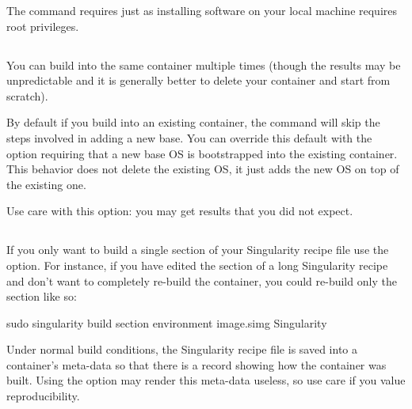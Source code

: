 \documentclass[letterpaper,10pt,english]{sphinxmanual}
\begin{document}
The command requires  just as installing software on your local machine
requires root privileges.


\subsection{}
\label{\detokenize{build_a_container:force}}
You can build into the same container multiple times (though the
results may be unpredictable and it is generally better to delete your
container and start from scratch).

By default if you build into an existing container, the  command will
skip the steps involved in adding a new base. You can override this
default with the  option requiring that a new base OS is bootstrapped
into the existing container. This behavior does not delete the
existing OS, it just adds the new OS on top of the existing one.

Use care with this option: you may get results that you did not
expect.


\subsection{}
\label{\detokenize{build_a_container:section}}
If you only want to build a single section of your Singularity recipe
file use the  option. For instance, if you have edited the  section of a
long Singularity recipe and don’t want to completely re-build the
container, you could re-build only the  section like so:

%
\begin{sphinxVerbatim}[commandchars=\\\{\}]
\PYGZdl{} sudo singularity build \PYGZhy{}\PYGZhy{}section environment image.simg Singularity
\end{sphinxVerbatim}

Under normal build conditions, the Singularity recipe file is saved into
a container’s meta-data so that there is a record showing how the
container was built. Using the  option may render this meta-data useless,
so use care if you value reproducibility.
\end{document}
